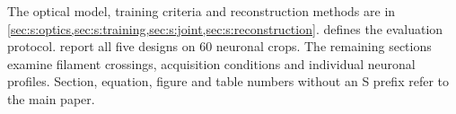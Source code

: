 \maketitlesupplementary

The optical model, training criteria and reconstruction methods are in \cref{sec:s:optics,sec:s:training,sec:s:joint,sec:s:reconstruction}.  defines the evaluation protocol.  report all five designs on 60 neuronal crops. The remaining sections examine filament crossings, acquisition conditions and individual neuronal profiles. Section, equation, figure and table numbers without an S prefix refer to the main paper.











\raggedbottom
{\small

}
